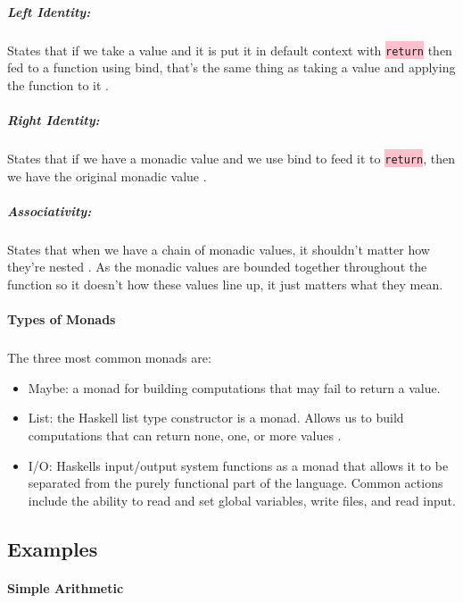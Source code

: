 \documentclass{article}
\begin{document}
\subparagraph{Left Identity:}

States that if we take a value and it is put it in default context with \colorbox{pink}{ \lstinline{return}} then fed to a function using bind, that's the same thing as taking a value and applying the function to it \cite{FM}. 

\subparagraph{Right Identity:}

States that if we have a monadic value and we use bind to feed it to \colorbox{pink}{ \lstinline{return}}, then we have the original monadic value \cite{FM}. 

\subparagraph{Associativity:} 

States that when we have a chain of monadic values, it shouldn't matter how they're nested \cite{FM}. As the monadic values are bounded together throughout the function so it doesn't how these values line up, it just matters what they mean. 

\paragraph{Types of Monads}

\subparagraph{}

The three most common monads are:

\begin{itemize}

\item Maybe: a monad for building computations that may fail to return a value. 

\item List: the Haskell list type constructor is a monad. Allows us to build computations that can return none, one, or more values \cite{AAM}. 

\item I/O: Haskells input/output system functions as a monad that allows it to be separated from the purely functional part of the language. Common actions include the ability to read and set global variables, write files, and read input. 

\end{itemize}

\subsection{Examples}

\paragraph{Simple Arithmetic}
\end{document}
